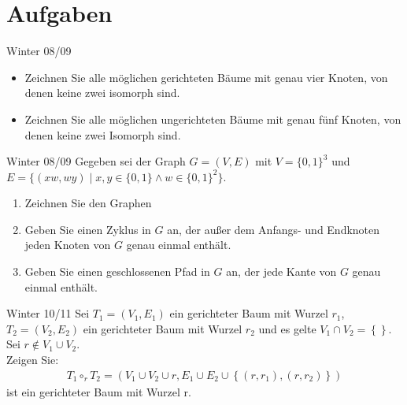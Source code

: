 \section{Aufgaben}
\begin{frame}{Winter 08/09}
    \begin{itemize}
        \item Zeichnen Sie alle möglichen gerichteten Bäume mit genau vier Knoten, von denen keine zwei isomorph sind.
        \item Zeichnen Sie alle möglichen ungerichteten Bäume mit genau fünf Knoten, von denen keine zwei Isomorph sind.
    \end{itemize}
\end{frame}

\begin{frame}{Winter 08/09}
    Gegeben sei der Graph $G=(V, E)$ mit $V=\{0, 1\}^3$ und $E=\{(xw, wy) \mid x, y \in \{0, 1\} \land w \in \{0, 1\}^2\}$.
    \begin{enumerate}
        \item Zeichnen Sie den Graphen
        \item Geben Sie einen Zyklus in $G$ an, der außer dem Anfangs- und Endknoten jeden Knoten von $G$ genau einmal enthält.
        \item Geben Sie einen geschlossenen Pfad in $G$ an, der jede Kante von $G$ genau einmal enthält.
    \end{enumerate}
\end{frame}

\begin{frame}{Winter 10/11}
    Sei $T_1 = \left( V_1, E_1 \right)$ ein gerichteter Baum mit Wurzel $r_1$, $T_2 = \left( V_2, E_2 \right)$ ein gerichteter Baum mit Wurzel $r_2$ und es gelte $V_1 \cap V_2 = \left\{  \right\}$. Sei $r \notin V_1 \cup V_2 $.\\
    Zeigen Sie:
    \begin{align*}
        T_1 \circ_r T_2 = \left( V_1 \cup V_2 \cup r, E_1 \cup E_2 \cup \left\{ \left( r, r_1 \right),\left( r,r_2 \right) \right\} \right)
    \end{align*}
    ist ein gerichteter Baum mit Wurzel r.
\end{frame}

